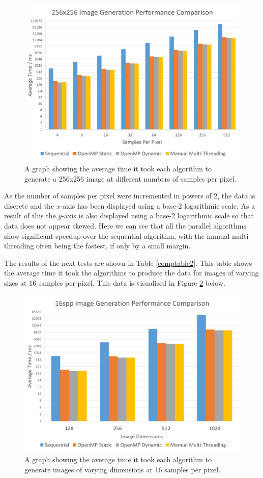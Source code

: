 \documentclass[12pt,journal,transmag]{IEEEtran}
\begin{document}
	\begin{figure}[!h]
		\centering
		\includegraphics[width=\textwidth]{IMAGES/performancecomparison1}
		\caption{A graph showing the average time it took each algorithm to generate a 256x256 image at different numbers of samples per pixel.}
		\label{graph1}
	\end{figure}
	
	As the number of samples per pixel were incremented in powers of 2, the data is discrete and the $x$-axis has been displayed using a base-2 logarithmic scale. As a result of this the $y$-axis is also displayed using a base-2 logarithmic scale so that data does not appear skewed. Here we can see that all the parallel algorithms show significant speedup over the sequential algorithm, with the manual multi-threading often being the fastest, if only by a small margin.
	
	The results of the next tests are shown in Table \ref{comptable2}. This table shows the average time it took the algorithms to produce the data for images of varying sizes at 16 samples per pixel. This data is visualised in Figure \ref{graph2} below.

	\begin{figure}[!h]
		\centering
		\includegraphics[width=\columnwidth]{IMAGES/performancecomparison2}
		\caption{A graph showing the average time it took each algorithm to generate images of varying dimensions at 16 samples per pixel.}
		\label{graph2}
	\end{figure}
\end{document}
